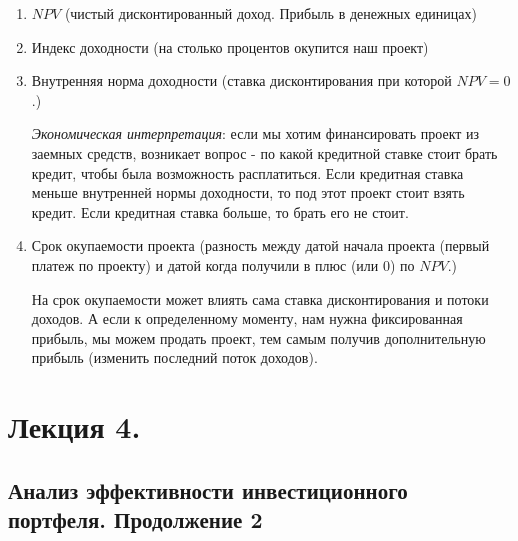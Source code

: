 \documentclass[reqno]{article}
\theoremstyle{definition}
\theoremstyle{definition}
\theoremstyle{definition}
\theoremstyle{definition}
\theoremstyle{definition}
\theoremstyle{definition}
\theoremstyle{definition}
\theoremstyle{definition}
\theoremstyle{definition}
\begin{document}
	\begin{enumerate}
		\item $NPV$ (чистый дисконтированный доход. Прибыль в денежных единицах)
		
		\item Индекс доходности (на столько процентов окупится наш проект)
		
		\item Внутренняя норма доходности (ставка дисконтирования при которой $NPV = 0$.)
		
		\setlength{\leftskip}{2em}
		\emph{Экономическая интерпретация}: если мы хотим финансировать проект из заемных средств, возникает вопрос - по какой кредитной ставке стоит брать кредит, чтобы была возможность расплатиться. Если кредитная ставка меньше внутренней нормы доходности, то под этот проект стоит взять кредит. Если кредитная ставка больше, то брать его не стоит.
		
		\setlength{\leftskip}{0em}
		\item Срок окупаемости проекта (разность между датой начала проекта (первый платеж по проекту) и датой когда получили в плюс (или 0) по $NPV$.)
		
		\setlength{\leftskip}{2em}
		На срок окупаемости может влиять сама ставка дисконтирования и потоки доходов. А  если к определенному моменту, нам нужна фиксированная прибыль, мы можем продать проект, тем самым получив дополнительную прибыль (изменить последний поток доходов).
	\end{enumerate}
	
	\section{Лекция 4.}
	\subsection{Анализ эффективности инвестиционного портфеля. Продолжение 2}
	
	
\end{document}
